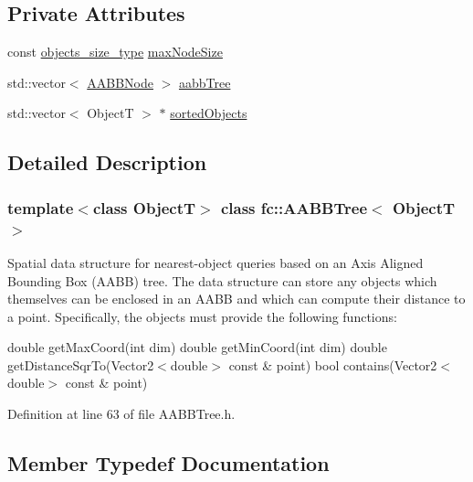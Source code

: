 \subsection*{Private Attributes}
\begin{DoxyCompactItemize}
\item 
const \hyperlink{classfc_1_1AABBTree_a3333c421c1fa34841043bd8545de8ea8}{objects\+\_\+size\+\_\+type} \hyperlink{classfc_1_1AABBTree_a4116e801983d055e249fa6166fa47266}{max\+Node\+Size}
\item 
std\+::vector$<$ \hyperlink{structfc_1_1AABBTree_1_1AABBNode}{A\+A\+B\+B\+Node} $>$ \hyperlink{classfc_1_1AABBTree_a971132f54e3a462458362901fac9b37f}{aabb\+Tree}
\item 
std\+::vector$<$ ObjectT $>$ $\ast$ \hyperlink{classfc_1_1AABBTree_ad28d9de49d42c0dffae1f6c47be5b523}{sorted\+Objects}
\end{DoxyCompactItemize}


\subsection{Detailed Description}
\subsubsection*{template$<$class ObjectT$>$\newline
class fc\+::\+A\+A\+B\+B\+Tree$<$ Object\+T $>$}

Spatial data structure for nearest-\/object queries based on an Axis Aligned Bounding Box (A\+A\+BB) tree. The data structure can store any objects which themselves can be enclosed in an A\+A\+BB and which can compute their distance to a point. Specifically, the objects must provide the following functions\+:

double get\+Max\+Coord(int dim) double get\+Min\+Coord(int dim) double get\+Distance\+Sqr\+To(\+Vector2$<$double$>$ const \& point) bool contains(\+Vector2$<$double$>$ const \& point) 

Definition at line 63 of file A\+A\+B\+B\+Tree.\+h.



\subsection{Member Typedef Documentation}
\mbox{\label{classfc_1_1AABBTree_a18706db5b992d8875e08dc325abf3811}} 
